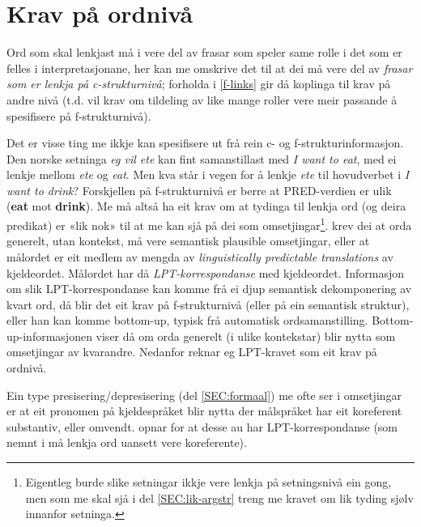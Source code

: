 \documentclass[11pt,a4paper,oneside,draft]{book}
\begin{document}
\section{Krav på ordnivå}
\label{sec-3.5}

\label{SEC:ordkrav}

Ord som skal lenkjast må i \cite{thunes2003eal} vere del av frasar som
speler same rolle i det som er felles i interpretasjonane, her kan me
omskrive det til at dei må vere del av \emph{frasar som er lenkja på c-strukturnivå}; forholda i \ref{f-links} gir då koplinga til krav på
andre nivå (t.d. vil krav om tildeling av like mange roller vere
meir passande å spesifisere på f-strukturnivå).

Det er visse ting me ikkje kan spesifisere ut frå rein c- og
f-strukturinformasjon. Den norske setninga \emph{eg vil ete} kan fint
samanstillast med \emph{I want to eat}, med ei lenkje mellom \emph{ete} og
\emph{eat}. Men kva står i vegen for å lenkje \emph{ete} til hovudverbet i \emph{I want to drink}? Forskjellen på f-strukturnivå er berre at PRED-verdien
er ulik (\textbf{eat} mot \textbf{drink}). Me må altså ha eit krav om at tydinga til
lenkja ord (og deira predikat) er «lik nok» til at me kan sjå på dei
som omsetjingar\footnote{Eigentleg burde slike setningar ikkje vere lenkja på
        setningsnivå ein gong, men som me skal sjå i del
        \ref{SEC:lik-argstr} treng me kravet om lik tyding 
        sjølv innanfor setninga. }. \citet[s.~74]{dyvik2009lmp} krev dei at orda
generelt, utan kontekst, må vere semantisk plausible omsetjingar,
eller at målordet er eit medlem av mengda av \emph{linguistically predictable translations} av kjeldeordet. Målordet har då
\emph{LPT-korrespondanse} med kjeldeordet. Informasjon om slik
LPT-korrespondanse kan komme frå ei djup semantisk dekomponering av
kvart ord, då blir det eit krav på f-strukturnivå (eller på ein
semantisk struktur), eller han kan komme bottom-up, typisk frå
automatisk ordsamanstilling. Bottom-up-informasjonen viser då om orda
generelt (i ulike kontekstar) blir nytta som omsetjingar av kvarandre.
Nedanfor reknar eg LPT-kravet som eit krav på ordnivå.

 
Ein type presisering/depresisering (del \ref{SEC:formaal}) me ofte ser
i omsetjingar er at eit pronomen på kjeldespråket blir nytta der
målspråket har eit koreferent substantiv, eller
omvendt. \citet{dyvik2009lmp} opnar for at desse au har
LPT-korrespondanse (som nemnt i \cite{thunes2003eal} må lenkja ord
uansett vere koreferente).
\end{document}
